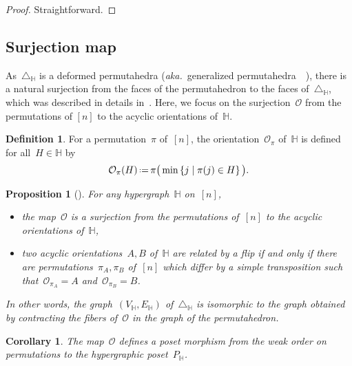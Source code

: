 \documentclass[reqno]{amsart}
\newtheorem{corollary}[theorem]{Corollary}
\newtheorem{proposition}[theorem]{Proposition}
\theoremstyle{definition}
\newtheorem{definition}[theorem]{Definition}
\newcommand{\set}[2]{\left\{ #1 \;\middle|\; #2 \right\}} %
\newcommand{\eqdef}{\mbox{\,\raisebox{0.2ex}{\scriptsize\ensuremath{\mathrm:}}\ensuremath{=}\,}} %
\newcommand{\simplex}{\triangle} %
\newcommand{\aka}{\textit{aka.}~} %
\newcommand{\Or}{\mathcal O}  %
\newcommand{\HH}{\mathbb H}  %
\begin{document}
\begin{proof}
Straightforward.
\end{proof}


\subsection{Surjection map} 
\label{subsec:surjection}

As~$\simplex_\HH$ is a deformed permutahedra (\aka generalized permutahedra~~\cite{Postnikov, PostnikovReinerWilliams}), there is a natural surjection from the faces of the permutahedron to the faces of~$\simplex_\HH$, which was described in details in~\cite[Lem.~2.9]{BenedettiBergeronMachacek}.
Here, we focus on the surjection~$\Or$ from the permutations of $[n]$ to the acyclic orientations of~$\HH$.

\begin{definition}
\label{def:surjection}
For a permutation~$\pi$ of~$[n]$, the orientation~$\Or_\pi$ of~$\HH$ is defined for all~$H \in \HH$ by
\[
\Or_\pi(H) \eqdef  \pi\big(\min\set{j}{\pi(j)\in H}\big).
\]
\end{definition}

\begin{proposition}[{\cite[Lem.~2.9]{BenedettiBergeronMachacek}}]
For any hypergraph~$\HH$ on~$[n]$,
\begin{itemize}
\item the map~$\Or$ is a surjection from the permutations of~$[n]$ to the acyclic orientations of~$\HH$,
\item two acyclic orientations~$A,B$ of~$\HH$ are related by a flip if and only if there are permutations~$\pi_A, \pi_B$ of~$[n]$ which differ by a simple transposition such that~$\Or_{\pi_A} = A$ and~$\Or_{\pi_B} = B$.
\end{itemize}
In other words, the graph~$(V_\HH, E_\HH)$ of~$\simplex_\HH$ is isomorphic to the graph obtained by contracting the fibers of~$\Or$ in the graph of the permutahedron.
\end{proposition}

\begin{corollary}
\label{coro:weakToP}
The map~$\Or$ defines a poset morphism from the weak order on permutations to the hypergraphic poset~$P_\HH$.
\end{corollary}
\end{document}
